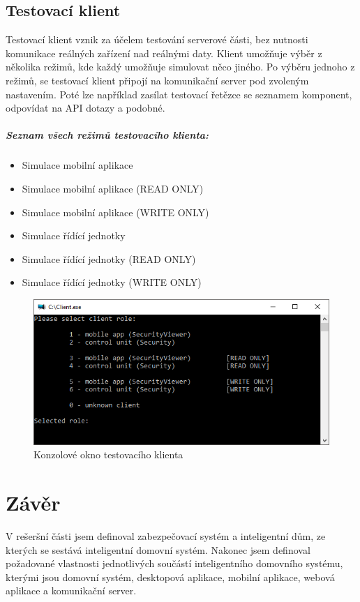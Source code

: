 \documentclass[FM,DP]{tulthesis}  %
\begin{document}
\section{Testovací klient}
Testovací klient vznik za účelem testování serverové části, bez nutnosti komunikace reálných zařízení nad reálnými daty. Klient umožňuje výběr z několika režimů, kde každý umožňuje simulovat něco jiného. Po výběru jednoho z režimů, se testovací klient připojí na komunikační  server pod zvoleným nastavením. Poté lze například zasílat testovací řetězce se seznamem komponent, odpovídat na API dotazy a podobné.

\paragraph{Seznam všech režimů testovacího klienta:}
\begin{itemize}
\item Simulace mobilní aplikace
\item Simulace mobilní aplikace (READ ONLY)
\item Simulace mobilní aplikace (WRITE ONLY)
\item Simulace řídící jednotky
\item Simulace řídící jednotky (READ ONLY)
\item Simulace řídící jednotky (WRITE ONLY)
\end{itemize}

\begin{figure}[H]
\begin{center}
\includegraphics[width=\textwidth]{images/testingClient.png}
\caption{Konzolové okno testovacího klienta}
\label{image}
\end{center}
\end{figure}



\chapter{Závěr}
V rešeršní části jsem definoval zabezpečovací systém a inteligentní dům, ze kterých se sestává inteligentní domovní systém. Nakonec jsem definoval požadované vlastnosti jednotlivých součástí inteligentního domovního systému, kterými jsou domovní systém, desktopová aplikace, mobilní aplikace, webová aplikace a komunikační server.
\end{document}
